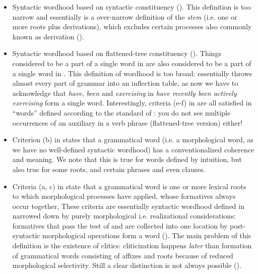 \documentclass[a4paper, oneside, scheme=plain, 12pt]{article}
\newcommand*{\citepage}[1]{p.~{#1}}
\newcommand*{\citepages}[1]{pp.~{#1}}
\newcommand*{\term}[1]{\emph{#1}}
\newcommand{\form}[1]{\emph{#1}}
\begin{document}
\begin{itemize}
    \item Syntactic wordhood based on syntactic constituency ().
    This definition is too narrow and essentially is a over-narrow definition of the \term{stem}
    (i.e. one or more roots plus derivations),
    which excludes certain processes also commonly known as derivation
    ().

    \item Syntactic wordhood based on flattened-tree constituency ().
    Things considered to be a part of a single word in 
    are also considered to be a part of a single word in .
    This definition of wordhood is too broad:
    essentially throws almost every part of grammar into an inflection table,
    as now we have to acknowledge that \form{have}, \form{been} and \form{exercising} in \form{have recently been actively exercising} form a single word.
    Interestingly, criteria (e-f) in \citet[\citepages{15-16}]{dixon2010basic2} are all satisfied in ``words'' defined according to the standard of :
    you do not see multiple occurrences of an auxiliary in a verb phrase (flattened-tree version) either!

    \item Criterion (b) in \citet[\citepage{13}]{dixon2010basic2} states that a grammatical word  (i.e. a morphological word, as we have no well-defined syntactic wordhood)
    has a conventionalized coherence and meaning.
    We note that this is true for words defined by intuition,
    but also true for some roots, and certain phrases and even clauses.

    \item Criteria (a, c) in \citet[\citepages{13-16}]{dixon2010basic2} state that 
    a grammatical word is one or more lexical roots to which morphological processes have applied,
    whose formatives always occur together, 
    These criteria are essentially syntactic wordhood defined in 
    narrowed down by purely morphological i.e. realizational considerations:
    formatives that pass the test of  
    and are collected into one location by post-syntactic morphological operations
    form a word ().
    The main problem of this definition is the existence of clitics:
    cliticization happens \emph{later} than formation of grammatical words consisting of affixes and roots
    because of reduced morphological selectivity.
    Still a clear distinction is not always possible ().
    

\end{itemize}
\end{document}
